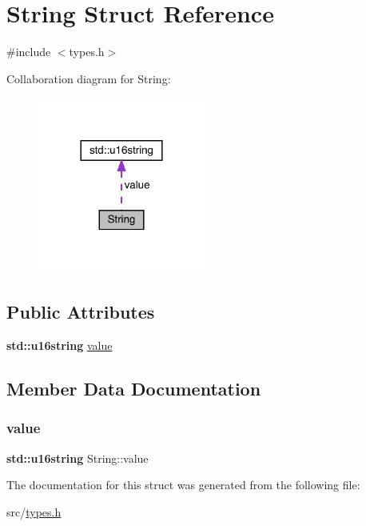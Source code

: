 \hypertarget{struct_string}{}\section{String Struct Reference}
\label{struct_string}


{\ttfamily \#include $<$types.\+h$>$}



Collaboration diagram for String\+:\nopagebreak
\begin{figure}[H]
\begin{center}
\leavevmode
\includegraphics[width=156pt]{struct_string__coll__graph}
\end{center}
\end{figure}
\subsection*{Public Attributes}
\begin{DoxyCompactItemize}
\item 
\textbf{ std\+::u16string} \hyperlink{struct_string_a8d279ee262f09d4e861c4578f85df015}{value}
\end{DoxyCompactItemize}


\subsection{Member Data Documentation}
\mbox{\label{struct_string_a8d279ee262f09d4e861c4578f85df015}} 
\subsubsection{\texorpdfstring{value}{value}}
{\footnotesize\ttfamily \textbf{ std\+::u16string} String\+::value}



The documentation for this struct was generated from the following file\+:\begin{DoxyCompactItemize}
\item 
src/\hyperlink{types_8h}{types.\+h}\end{DoxyCompactItemize}

